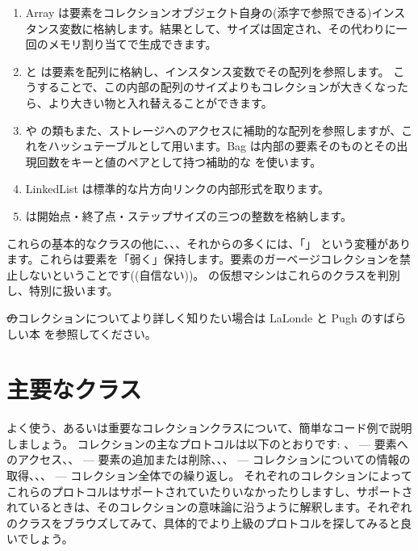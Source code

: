 \documentclass[a4paper,10pt,twoside]{book}
\begin{document}
\begin{enumerate}
  \item Array は要素をコレクションオブジェクト自身の(添字で参照できる)インスタンス変数に格納します。結果として、サイズは固定され、その代わりに一回のメモリ割り当てで生成できます。
  \item {} と  は要素を配列に格納し、インスタンス変数でその配列を参照します。
  こうすることで、この内部の配列のサイズよりもコレクションが大きくなったら、より大きい物と入れ替えることができます。
  \item {} や  の類もまた、ストレージへのアクセスに補助的な配列を参照しますが、これをハッシュテーブルとして用います。Bag は内部の要素そのものとその出現回数をキーと値のペアとして持つ補助的な  を使います。
  \item LinkedList は標準的な片方向リンクの内部形式を取ります。
  \item {} は開始点・終了点・ステップサイズの三つの整数を格納します。
\end{enumerate}
これらの基本的なクラスの他に、、、それからの多くには、「」 という変種があります。これらは要素を「弱く」保持します。\ie 要素のガーベージコレクションを禁止しないということです((自信ない))。
\pharo の仮想マシンはこれらのクラスを判別し、特別に扱います。

\st のコレクションについてより詳しく知りたい場合は LaLonde と Pugh のすばらしい本\cite{LaLo90a} を参照してください。

\section{主要なクラス}
よく使う、あるいは重要なコレクションクラスについて、簡単なコード例で説明しましょう。
コレクションの主なプロトコルは以下のとおりです: 、 --- 要素へのアクセス、、 --- 要素の追加または削除、、、 --- コレクションについての情報の取得、、、 --- コレクション全体での繰り返し。
それぞれのコレクションによってこれらのプロトコルはサポートされていたりいなかったりしますし、サポートされているときは、そのコレクションの意味論に沿うように解釈します。それぞれのクラスをブラウズしてみて、具体的でより上級のプロトコルを探してみると良いでしょう。
\end{document}
